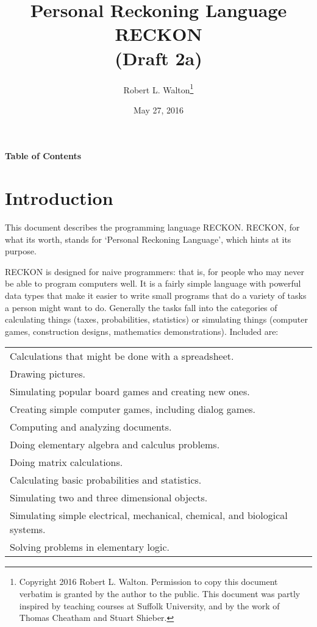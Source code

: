 \documentclass[12pt]{article}
\makeatletter
\renewcommand\tableofcontents{%
    \begin{list}{}%
	     {\setlength{\itemsep}{0in}%
	      \setlength{\topsep}{0in}%
	      \setlength{\parsep}{1ex}%
	      \setlength{\labelwidth}{0in}%
	      \setlength{\baselineskip}{1.5ex}%
	      \setlength{\leftmargin}{0.8in}%
	      \setlength{\rightmargin}{0.8in}}%
    \item\@starttoc{toc}%
    \end{list}}
\makeatother
\begin{document}
        
\title{Personal Reckoning Language\\[2ex]
       RECKON\\[2ex]
       (Draft 2a)}

\author{Robert L. Walton\thanks{Copyright 2016 Robert L. Walton.
Permission to copy this document verbatim is granted by the author
to the public.  This document was partly inspired
by teaching courses at Suffolk University, and by the work of Thomas
Cheatham and Stuart Shieber.}}

\date{May 27, 2016}

\maketitle

\newpage
\begin{center}
\large \bf Table of Contents
\end{center}

\bigskip

\tableofcontents 

\newpage

\section{Introduction}

This document describes the programming language RECKON.  RECKON,
for what its worth, stands for `Personal Reckoning Language',
which hints at its purpose.

RECKON is designed for naive programmers: that is, for people who may never
be able to program computers well.  It is a fairly simple language with
powerful data types that make it easier to write small programs
that do a variety of tasks a person might want to do.  Generally
the tasks fall into the categories of calculating things (taxes,
probabilities, statistics) or simulating things
(computer games, construction designs, mathematics demonstrations).
Included are:

\begin{center}
\begin{tabular}{l}
Calculations that might be done with a spreadsheet. \\
Drawing pictures. \\
Simulating popular board games and creating new ones. \\
Creating simple computer games, including dialog games. \\
Computing and analyzing documents. \\
Doing elementary algebra and calculus problems. \\
Doing matrix calculations. \\ 
Calculating basic probabilities and statistics. \\
Simulating two and three dimensional objects. \\
Simulating simple electrical, mechanical, chemical, and biological systems.\\
Solving problems in elementary logic. \\
\end{tabular}
\end{center}
\end{document}
